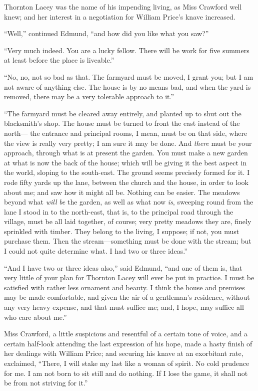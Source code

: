 Thornton Lacey was the name of his impending living,
as Miss Crawford well knew; and her interest in a negotiation
for William Price's knave increased.

``Well,'' continued Edmund, ``and how did you like what
you saw?''

``Very much indeed.  You are a lucky fellow.  There will be
work for five summers at least before the place is liveable.''

``No, no, not so bad as that.  The farmyard must be moved,
I grant you; but I am not aware of anything else.
The house is by no means bad, and when the yard is removed,
there may be a very tolerable approach to it.''

``The farmyard must be cleared away entirely, and planted
up to shut out the blacksmith's shop.  The house must
be turned to front the east instead of the north---%
the entrance and principal rooms, I mean, must be on
that side, where the view is really very pretty; I am
sure it may be done.  And \emph{there} must be your approach,
through what is at present the garden.  You must make
a new garden at what is now the back of the house;
which will be giving it the best aspect in the world,
sloping to the south-east. The ground seems precisely
formed for it.  I rode fifty yards up the lane,
between the church and the house, in order to look about me;
and saw how it might all be.  Nothing can be easier.
The meadows beyond what \emph{will} \emph{be} the garden, as well
as what now \emph{is}, sweeping round from the lane I stood
in to the north-east, that is, to the principal road
through the village, must be all laid together, of course;
very pretty meadows they are, finely sprinkled with timber.
They belong to the living, I suppose; if not, you must
purchase them.  Then the stream---something must be done
with the stream; but I could not quite determine what.
I had two or three ideas.''

``And I have two or three ideas also,'' said Edmund,
``and one of them is, that very little of your plan
for Thornton Lacey will ever be put in practice.
I must be satisfied with rather less ornament and beauty.
I think the house and premises may be made comfortable,
and given the air of a gentleman's residence, without any
very heavy expense, and that must suffice me; and, I hope,
may suffice all who care about me.''

Miss Crawford, a little suspicious and resentful of a
certain tone of voice, and a certain half-look attending
the last expression of his hope, made a hasty finish
of her dealings with William Price; and securing his knave
at an exorbitant rate, exclaimed, ``There, I will stake
my last like a woman of spirit.  No cold prudence for me.
I am not born to sit still and do nothing.  If I lose
the game, it shall not be from not striving for it.''

